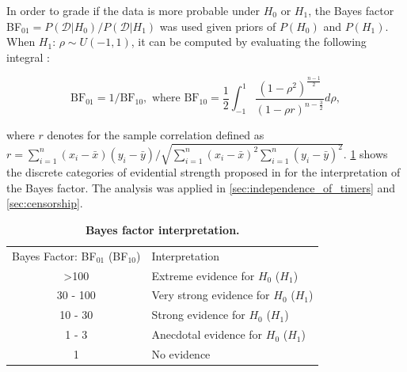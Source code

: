 \documentclass[11pt, a4paper]{article}
\begin{document}
In order to grade if the data is more probable under $H_0$ or $H_1$, the Bayes factor BF$_{01} = P(\mathcal{D} | H_0)/P(\mathcal{D} | H_1)$ was used given priors of $P(H_0)$ and $P(H_1)$. When $H_1$: $\rho \sim U(-1,1)$, it can be computed by evaluating the following integral \parencite{Jeffreys.1961, Wagenmakers.2016}:
\begin{linenomath*}
    \begin{equation*}
        \mathrm{BF}_{01} = 1/\mathrm{BF}{_{10}}, \text{ where } \mathrm{BF}_{10} = \frac{1}{2}\int_{-1}^{1} \frac{(1 - \rho^2)^{\frac{n-1}{2}}}{(1 - \rho r)^{n-\frac{3}{2}}} d\rho,
    \end{equation*}
\end{linenomath*}
where $r$ denotes for the sample correlation defined as $r = \sum_{i=1}^n (x_i - \bar{x}) (y_i - \bar{y})/\sqrt{\sum_{i=1}^n (x_i - \bar{x})^2 \sum_{i=1}^n (y_i - \bar{y})^2}$. \cref{tab:bayes_factor_interpretation} shows the discrete categories of evidential strength proposed in \cite{Jeffreys.1961} for the interpretation of the Bayes factor. The analysis was applied in \cref{sec:independence_of_timers} and \cref{sec:censorship}.
\begin{table}[h]
    \centering
    \begin{tabular}{@{}cl@{}}
        \toprule
        Bayes Factor: BF$_{01}$ (BF$_{10}$) & Interpretation                         \\ \cmidrule(l){1-1} \cmidrule(l){2-2}
        \textgreater{}100                   & Extreme evidence for $H_0$ ($H_1$)     \\
        30 - 100                            & Very strong evidence for $H_0$ ($H_1$) \\
        10 - 30                             & Strong evidence for $H_0$ ($H_1$)      \\
        1 - 3                               & Anecdotal evidence for $H_0$ ($H_1$)   \\
        1                                   & No evidence      \\                 
        \bottomrule    
    \end{tabular}
    \caption{\textbf{Bayes factor interpretation.}}
    \label{tab:bayes_factor_interpretation}
\end{table}
\end{document}
